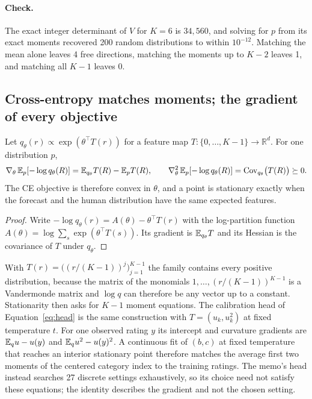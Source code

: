 \paragraph{Check.}
The exact integer determinant of $V$ for $K=6$ is $34{,}560$, and solving for $p$ from its exact moments recovered 200 random distributions to within $10^{-12}$.
Matching the mean alone leaves 4 free directions, matching the moments up to $K-2$ leaves 1, and matching all $K-1$ leaves 0.

\subsection{Cross-entropy matches moments; the gradient of every objective}
\label{app:moments-grad}

\begin{proposition}
\label{prop:expfam}
Let $q_\theta(r)\propto\exp(\theta^\top T(r))$ for a feature map $T:\{0,\dots,K-1\}\to\mathbb R^d$.
For one distribution $p$,
\[
\nabla_\theta\,\mathbb{E}_p[-\log q_\theta(R)]=\mathbb{E}_{q_\theta}T(R)-\mathbb{E}_pT(R),
\qquad
\nabla_\theta^2\,\mathbb{E}_p[-\log q_\theta(R)]=\operatorname{Cov}_{q_\theta}\bigl(T(R)\bigr)\succeq0 .
\]
The CE objective is therefore convex in $\theta$, and a point is stationary exactly when the forecast and the human distribution have the same expected features.
\end{proposition}

\begin{proof}
Write $-\log q_\theta(r)=A(\theta)-\theta^\top T(r)$ with the log-partition function $A(\theta)=\log\sum_s\exp(\theta^\top T(s))$.
Its gradient is $\mathbb{E}_{q_\theta}T$ and its Hessian is the covariance of $T$ under $q_\theta$.
\end{proof}

With $T(r)=\bigl((r/(K-1))^j\bigr)_{j=1}^{K-1}$ the family contains every positive distribution, because the matrix of the monomials $1,\dots,(r/(K-1))^{K-1}$ is a Vandermonde matrix and $\log q$ can therefore be any vector up to a constant.
Stationarity then asks for $K-1$ moment equations.
The calibration head of Equation~\eqref{eq:head} is the same construction with $T=(u_k,u_k^2)$ at fixed temperature $t$.
For one observed rating $y$ its intercept and curvature gradients are $\mathbb{E}_qu-u(y)$ and $\mathbb{E}_qu^2-u(y)^2$.
A continuous fit of $(b,c)$ at fixed temperature that reaches an interior stationary point therefore matches the average first two moments of the centered category index to the training ratings.
The memo's head instead searches 27 discrete settings exhaustively, so its choice need not satisfy these equations; the identity describes the gradient and not the chosen setting.

